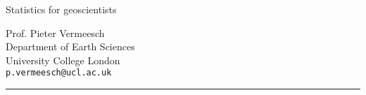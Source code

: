 \documentclass[11pt]{book}
\begin{document}
\begin{titlepage}
  
  \parbox[t]{0.93\textwidth}{
    \parbox[t]{0.91\textwidth}{
      \raggedleft
      \fontsize{50pt}{80pt}
      \vspace{0.7cm}
      \Huge
      Statistics for geoscientists\\
      
      \vspace{0.7cm}
    }
  }
  
  \vfill	
  \parbox[t]{0.93\textwidth}{
    \raggedleft
    \large
        {\Large Prof. Pieter Vermeesch}\\[4pt]
        Department of Earth Sciences\\
        University College London\\[4pt]
        \texttt{p.vermeesch@ucl.ac.uk}\\
	
        \hfill\rule{0.2\linewidth}{1pt}
}
	
\end{titlepage}

\tableofcontents


































\end{document}
